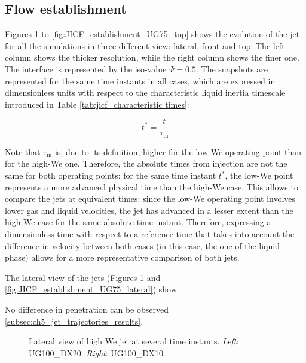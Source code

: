\subsection{Flow establishment}

Figures \ref{fig:JICF_establishment_UG100_lateral} to \ref{fig:JICF_establishment_UG75_top} shows the evolution of the jet for all the simulations in three different view: lateral, front and top. The left column shows the thicker resolution, while the right column shows the finer one. The interface is represented by the iso-value $\Psi = 0.5$. The snapshots are represented for the same time instants in all cases, which are expressed in dimensionless units with respect to the characteristic liquid inertia timescale introduced in Table \ref{tab:jicf_characteristic times}:

\begin{equation}
t^* = \frac{t}{\tau_\mathrm{in}}
\end{equation}

Note that $\tau_\mathrm{in}$ is, due to its definition, higher for the low-We operating point than for the high-We one. Therefore, the absolute times from injection are not the same for both operating points: for the same time instant $t^*$, the low-We point represents a more advanced physical time than the high-We case. This allows to compare the jets at equivalent times: since the low-We operating point involves lower gas and liquid velocities, the jet has advanced in a lesser extent than the high-We case for the same absolute time instant. Therefore, expressing a dimensionless time with respect to a reference time that takes into account the difference in velocity between both cases (in this case, the one of the liquid phase) allows for a more representative comparison of both jets.

The lateral view of the jets (Figures \ref{fig:JICF_establishment_UG100_lateral} and \ref{fig:JICF_establishment_UG75_lateral}) show 

No difference in penetration can be observed \ref{subsec:ch5_jet_trajectories_results}.


\clearpage

\begin{figure}[ht]
\centering
{}
\caption[Lateral view of high We jet at several time instants. ]{Lateral view of high We jet at several time instants. \textsl{Left}: UG100\_DX20. \textsl{Right}: UG100\_DX10.}
\label{fig:JICF_establishment_UG100_lateral}
\end{figure}

